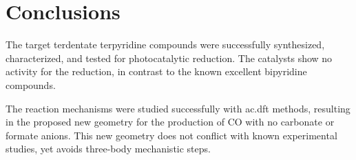 \chapter{Conclusions}

The target  terdentate terpyridine compounds were successfully synthesized, characterized, and tested for photocatalytic  reduction. The catalysts show no activity for the reduction, in contrast to the known excellent bipyridine compounds. 

The reaction mechanisms were studied successfully with \gls{ac.dft} methods, resulting in the proposed new geometry for the production of {CO} with no carbonate or formate anions. This new geometry does not conflict with known experimental studies, yet avoids three-body mechanistic steps.


